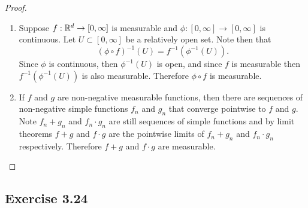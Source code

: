 \documentclass[hw_all.tex]{subfiles}
\begin{document}
\begin{proof}
\begin{enumerate}
        \item
            Suppose $f : \mathbb{R}^d \to [0,\infty]$ is measurable and $\phi : [0,\infty] \to [0, \infty]$ is continuous. Let $U \subset [0,\infty]$ be a relatively open set. Note then that
            \[
                (\phi \circ f)^{-1}(U) = f^{-1}(\phi^{-1}(U))
            .\]
            Since $\phi$ is continuous, then $\phi^{-1}(U)$ is open, and since $f$ is measurable then $f^{-1}(\phi^{-1}(U))$ is also measurable. Therefore $\phi \circ f$ is measurable.

        \item 
            If $f$ and $g$ are non-negative measurable functions, then there are sequences of non-negative simple functions $f_n$ and $g_n$ that converge pointwise to $f$ and $g$. Note $f_n + g_n$ and $f_n \cdot g_n$ are still sequences of simple functions and by limit theorems $f + g$ and $f \cdot g$ are the pointwise limits of $f_n + g_n$ and $f_n \cdot g_n$ respectively. Therefore $f + g$ and $f \cdot g$ are measurable.

       \end{enumerate}
\end{proof}

\subsection{Exercise 3.24}
\end{document}
